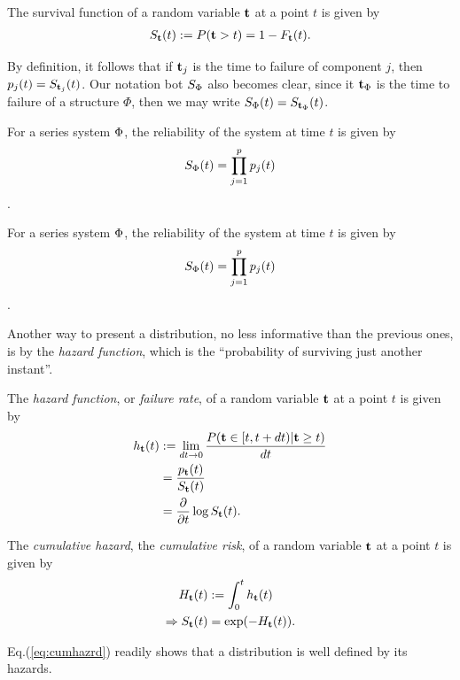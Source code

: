 \begin{definition}
The survival function of a random variable $\mathbf{t}$ at a point $t$ is given by 
\begin{align}
	S_{\mathbf{t}} (t):= P(\mathbf{t}>t)=1-F_{\mathbf{t}} (t).
\end{align}
\end{definition}
By definition, it follows that if $\mathbf{t}_j$ is the time to failure of component $j$, then $p_j(t)=S_{\mathbf{t}_j} (t)$.
Our notation bot $S_\Phi$ also becomes clear, since it $\mathbf{t}_\Phi$ is the time to failure of a structure $\Phi$, then we may write $S_\Phi(t)=S_{\mathbf{t}_\Phi} (t)$.


\begin{example}
For a series system $\Phi$, the reliability of the system at time $t$ is given by $$S_{\Phi} (t)=\prod_{j=1}^{p} p_j(t)$$.
\end{example}


\begin{example}
For a series system $\Phi$, the reliability of the system at time $t$ is given by $$S_{\Phi} (t)=\prod_{j=1}^{p} p_j(t)$$.
\end{example}





Another way to present a distribution, no less informative than the previous ones, is by the \emph{hazard function}, which is the ``probability of surviving just another instant''.
\begin{definition}
The \emph{hazard function}, or \emph{failure rate}, of a random variable $\mathbf{t}$ at a point $t$ is given by 
\begin{align}
	h_{\mathbf{t}} (t) &:= \lim_{dt\to 0}\frac{P( \mathbf{t} \in [t,t+dt)|\mathbf{t} \geq t )}{dt} \label{eq:hazard}\\
	&= \frac{p_{\mathbf{t}} (t)}{S_{\mathbf{t}} (t)} \\
	&= \frac{\partial}{\partial t}\log S_{\mathbf{t}} (t).
\end{align}
\end{definition}





\begin{definition}
The \emph{cumulative hazard}, \aka the \emph{cumulative risk}, of a random variable $\mathbf{t}$ at a point $t$ is given by 
\begin{align}
	H_{\mathbf{t}} (t) &:= \int_{0}^{t}h_{\mathbf{t}} (t) \\
	\Rightarrow S_{\mathbf{t}} (t) &= \exp(-H_{\mathbf{t}} (t)). \label{eq:cumhazrd}
\end{align}
\end{definition}
Eq.(\ref{eq:cumhazrd}) readily shows that a distribution is well defined by its hazards.




